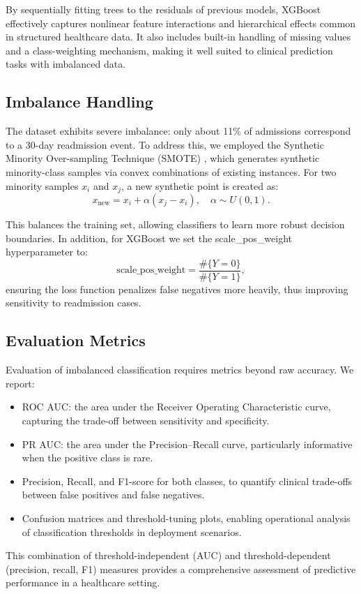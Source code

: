 \documentclass{article}
\begin{document}
By sequentially fitting trees to the residuals of previous models, XGBoost effectively captures nonlinear feature interactions and hierarchical effects common in structured healthcare data. It also includes built-in handling of missing values and a class-weighting mechanism, making it well suited to clinical prediction tasks with imbalanced data.

\subsection{Imbalance Handling}
The dataset exhibits severe imbalance: only about 11\% of admissions correspond to a 30-day readmission event. To address this, we employed the Synthetic Minority Over-sampling Technique (SMOTE) \cite{chawla2002smote}, which generates synthetic minority-class samples via convex combinations of existing instances. For two minority samples $x_i$ and $x_j$, a new synthetic point is created as:
\[
x_{\text{new}} = x_i + \alpha (x_j - x_i), \quad \alpha \sim U(0,1).
\]

This balances the training set, allowing classifiers to learn more robust decision boundaries. In addition, for XGBoost we set the scale\_pos\_weight hyperparameter to:
\[
\text{scale\_pos\_weight} = \frac{\#\{Y=0\}}{\#\{Y=1\}},
\]
ensuring the loss function penalizes false negatives more heavily, thus improving sensitivity to readmission cases.

\subsection{Evaluation Metrics}
Evaluation of imbalanced classification requires metrics beyond raw accuracy. We report:
\begin{itemize}
    \item ROC AUC: the area under the Receiver Operating Characteristic curve, capturing the trade-off between sensitivity and specificity.
    \item PR AUC: the area under the Precision–Recall curve, particularly informative when the positive class is rare.
    \item Precision, Recall, and F1-score for both classes, to quantify clinical trade-offs between false positives and false negatives.
    \item Confusion matrices and threshold-tuning plots, enabling operational analysis of classification thresholds in deployment scenarios.
\end{itemize}
This combination of threshold-independent (AUC) and threshold-dependent (precision, recall, F1) measures provides a comprehensive assessment of predictive performance in a healthcare setting.
\end{document}
